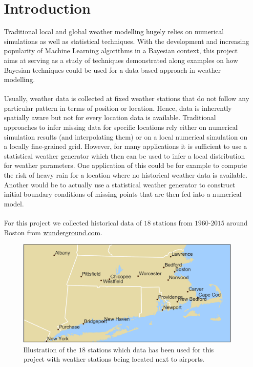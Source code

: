 \documentclass{article}
\begin{document}
\singlespacing
\section{Introduction}
Traditional local and global weather modelling hugely relies on numerical simulations as well as statistical techniques. With the development and increasing popularity of Machine Learning algorithms in a Bayesian context, this project aims at serving as a study of techniques demonstrated along examples on how Bayesian techniques could be used for a data based approach in weather modelling.
\\
\\
Usually, weather data is collected at fixed weather stations that do not follow any particular pattern in terms of position or location. Hence, data is inherently spatially aware but not for every location data is available. Traditional approaches to infer missing data for specific locations rely either on numerical simulation results (and interpolating them) or on a local numerical simulation on a locally fine-grained grid. However, for many applications it is sufficient to use a statistical weather generator\cite{stochwg} which then can be used to infer a local distribution for weather parameters. One application of this could be for example to compute the risk of heavy rain for a location where no historical weather data is available. Another would be to actually use a statistical weather generator to construct initial boundary conditions of missing points that are then fed into a numerical model.
\\
\\
For this project we collected historical data of $18$ stations from $1960$-$2015$ around Boston from \url{wunderground.com}. 
\begin{figure}
\centering
\includegraphics[scale=0.5]{../images/top_stations.png}
\caption{Illustration of the $18$ stations which data has been used for this project with weather stations being located next to airports.}
\end{figure}
\end{document}
